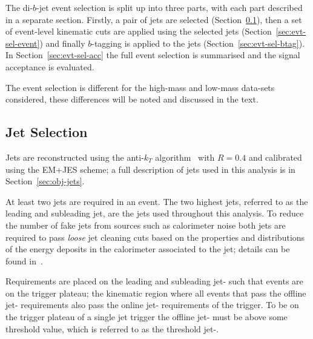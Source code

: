 The di-$b$-jet event selection is split up into three parts, with each part described in a separate section.
Firstly, a pair of jets are selected (Section~\ref{sec:evt-sel-jets}),
then a set of event-level kinematic cuts are applied using the selected jets (Section~\ref{sec:evt-sel-event})
and finally $b$-tagging is applied to the jets (Section~\ref{sec:evt-sel-btag}).
In Section~\ref{sec:evt-sel-acc} the full event selection is summarised and
the signal acceptance is evaluated.

The event selection is different for the high-mass and low-mass data-sets considered,
these differences will be noted and discussed in the text.

\subsection{Jet Selection}
\label{sec:evt-sel-jets}

Jets are reconstructed using the anti-$k_T$ algorithm~\cite{obj-jets_reco_akt} with $R=0.4$
and calibrated using the EM+JES scheme;
a full description of jets used in this analysis is in Section~\ref{sec:obj-jets}.

At least two jets are required in an event.
The two highest \pT{} jets, referred to as the leading and subleading jet,
are the jets used throughout this analysis.
To reduce the number of fake jets from sources such as calorimeter noise
both jets are required to pass \textit{loose} jet cleaning cuts
based on the properties and distributions of the energy deposits in the calorimeter associated to the jet;
details can be found in~\cite{evt-jet_cleaning}.

Requirements are placed on  the leading and subleading jet-\pT{} such that events are on the trigger plateau;
the kinematic region where all events that pass the offline jet-\pT{} requirements
also pass the online jet-\pT{} requirements of the trigger.
To be on the trigger plateau of a single jet trigger the offline jet-\pT{} must be above some threshold value,
which is referred to as the threshold jet-\pT{}.


